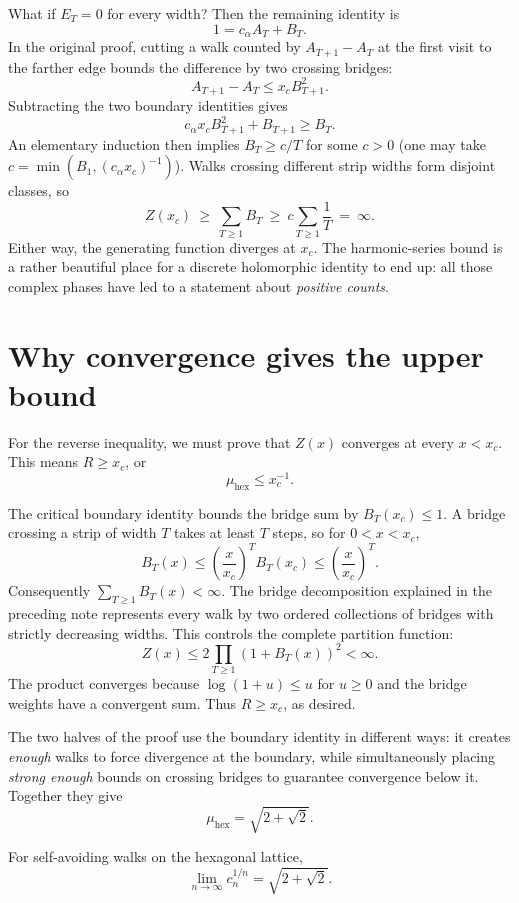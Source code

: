 What if $E_T=0$ for every width? Then the remaining identity is
\[
 1=c_\alpha A_T+B_T.
\]
In the original proof, cutting a walk counted by $A_{T+1}-A_T$ at the first visit to the farther edge bounds the difference by two crossing bridges:
\[
 A_{T+1}-A_T\le x_c B_{T+1}^2.
\]
Subtracting the two boundary identities gives
\[
 \boxed{c_\alpha x_c B_{T+1}^2+B_{T+1}\ge B_T.}
\]
An elementary induction then implies $B_T\ge c/T$ for some $c>0$ (one may take $c=\min(B_1,(c_\alpha x_c)^{-1})$). Walks crossing different strip widths form disjoint classes, so
\[
 Z(x_c)\ \ge\ \sum_{T\ge1}B_T
 \ \ge\ c\sum_{T\ge1}\frac1T
 \ =\ \infty.
\]
Either way, the generating function diverges at $x_c$. The harmonic-series bound is a rather beautiful place for a discrete holomorphic identity to end up: all those complex phases have led to a statement about \emph{positive counts}.

\section{Why convergence gives the upper bound}

For the reverse inequality, we must prove that $Z(x)$ converges at every $x<x_c$. This means $R\ge x_c$, or
\[
 \boxed{\mu_{\mathrm{hex}}\le x_c^{-1}.}
\]

The critical boundary identity bounds the bridge sum by $B_T(x_c)\le1$. A bridge crossing a strip of width $T$ takes at least $T$ steps, so for $0<x<x_c$,
\[
  B_T(x)
  \le \left(\frac{x}{x_c}\right)^T B_T(x_c)
  \le \left(\frac{x}{x_c}\right)^T.
\]
Consequently $\sum_{T\ge1}B_T(x)<\infty$. The bridge decomposition explained in the preceding note represents every walk by two ordered collections of bridges with strictly decreasing widths. This controls the complete partition function:
\[
 \boxed{Z(x)\le2\prod_{T\ge1}(1+B_T(x))^2<\infty.}
\]
The product converges because $\log(1+u)\le u$ for $u\ge0$ and the bridge weights have a convergent sum. Thus $R\ge x_c$, as desired.

The two halves of the proof use the boundary identity in different ways: it creates \emph{enough} walks to force divergence at the boundary, while simultaneously placing \emph{strong enough} bounds on crossing bridges to guarantee convergence below it. Together they give
\[
 \boxed{\mu_{\mathrm{hex}}=\sqrt{2+\sqrt2}.}
\]

\begin{theorem}
For self-avoiding walks on the hexagonal lattice,
\[
  \lim_{n\to\infty} c_n^{1/n}=\sqrt{2+\sqrt2}.
\]
\end{theorem}

